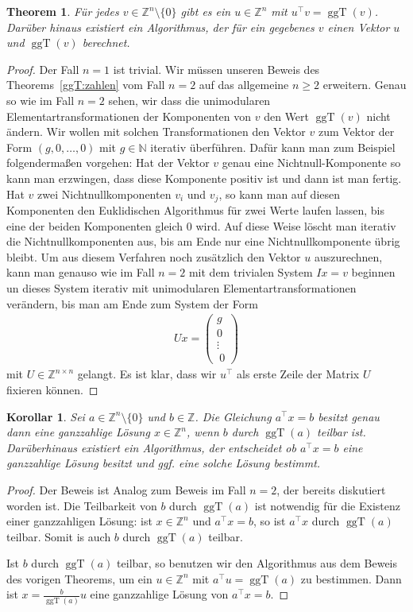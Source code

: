 \documentclass[
a4paper,landscape,16pt,
bibliography=totocnumbered,
numbers=noenddot,
]{scrartcl}
\numberwithin{equation}{subsection}
\newcommand{\N}{\mathbb N}
\newcommand{\Z}{\mathbb Z}
\newcommand{\ggT}{\operatorname{ggT}} %
\theoremstyle{plain}
\newtheorem*{thm}{Theorem}
\newtheorem*{klr}{Korollar}
\theoremstyle{definition}
\begin{document}
\begin{thm} 
	Für jedes $v \in \Z^n \setminus \{0\}$ gibt es ein $u \in \Z^n$ mit $u^\top v = \ggT(v)$. Darüber hinaus existiert ein Algorithmus, der für ein gegebenes $v$ einen Vektor $u$ und $\ggT(v)$ berechnet. 
\end{thm} 
\begin{proof} 
	Der Fall $n =1$ ist trivial. 
	Wir müssen unseren Beweis des Theorems~\ref{ggT:zahlen} vom Fall $n=2$ auf das allgemeine $n \ge 2$ erweitern. Genau so wie im Fall $n=2$ sehen, wir dass die unimodularen Elementartransformationen der Komponenten von $v$ den Wert $\ggT(v)$ nicht ändern. Wir wollen mit solchen Transformationen den Vektor $v$ zum Vektor der Form $(g,0,\ldots, 0)$ mit $g \in \N$ iterativ überführen. Dafür kann man zum Beispiel folgendermaßen vorgehen: Hat der Vektor $v$ genau eine Nichtnull-Komponente so kann man erzwingen, dass diese Komponente positiv ist und dann ist man fertig. Hat $v$ zwei Nichtnullkomponenten $v_i$ und $v_j$, so kann man auf diesen Komponenten den Euklidischen Algorithmus für zwei Werte laufen lassen, bis eine der beiden Komponenten gleich $0$ wird. Auf diese Weise löscht man iterativ die Nichtnullkomponenten aus, bis am Ende nur eine Nichtnullkomponente übrig bleibt. Um aus diesem Verfahren noch zusätzlich den Vektor $u$ auszurechnen, kann man genauso wie im Fall $n=2$ mit dem trivialen System $I x = v$ beginnen un dieses System iterativ mit unimodularen Elementartransformationen verändern, bis man am Ende zum System der Form 
	\begin{align*}
			U x = \begin{pmatrix} g \\ 0 \\ \vdots \\\ 0 \end{pmatrix} 
	\end{align*} 
	mit $U \in \Z^{n \times n}$ gelangt. Es ist klar, dass wir $u^\top$ als erste Zeile der Matrix $U$ fixieren können. 
\end{proof} 


\begin{klr}
	Sei $a \in \Z^n \setminus \{0\}$ und $b \in \Z$. Die Gleichung $a^\top x = b$ besitzt genau dann eine ganzzahlige Lösung $x \in \Z^n$, wenn $b$ durch $\ggT(a)$ teilbar ist. Darüberhinaus existiert ein Algorithmus, der entscheidet ob $a^\top x = b$ eine ganzzahlige Lösung besitzt und ggf. eine solche Lösung bestimmt. 
\end{klr} 
\begin{proof} 
	Der Beweis ist Analog zum Beweis im Fall $n=2$, der bereits diskutiert worden ist. Die Teilbarkeit von $b$ durch $\ggT(a)$ ist notwendig für die Existenz einer ganzzahligen Lösung: ist $x \in \Z^n$ und $a^\top  x = b$, so ist $a^\top x$ durch $\ggT(a)$ teilbar. Somit is auch $b$ durch $\ggT(a)$ teilbar. 
	
	Ist $b$ durch $\ggT(a)$ teilbar, so benutzen wir den Algorithmus aus dem Beweis des vorigen Theorems, um ein $u \in \Z^n$ mit $a^\top u = \ggT(a)$ zu bestimmen. Dann ist $x = \frac{b}{\ggT(a)} u $ eine ganzzahlige Lösung von $a^\top x = b$. 
\end{proof} 
\end{document}
